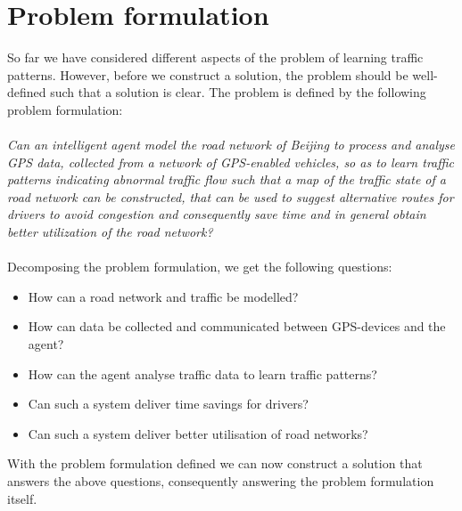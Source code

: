 \section{Problem formulation}
So far we have considered different aspects of the problem of learning traffic patterns. However, before we construct a solution, the problem should be well-defined such that a solution is clear. The problem is defined by the following problem formulation:
\\\\
\emph{Can an intelligent agent model the road network of Beijing to process and analyse GPS data, collected from a network of GPS-enabled vehicles, so as to learn traffic patterns indicating abnormal traffic flow such that a map of the traffic state of a road network can be constructed, that can be used to suggest alternative routes for drivers to avoid congestion and consequently save time and in general obtain better utilization of the road network?}
\\\\
Decomposing the problem formulation, we get the following questions:

\begin{itemize}
\item How can a road network and traffic be modelled?
\item How can data be collected and communicated between GPS-devices and the agent?
\item How can the agent analyse traffic data to learn traffic patterns?
\item Can such a system deliver time savings for drivers?
\item Can such a system deliver better utilisation of road networks?
\end{itemize}

With the problem formulation defined we can now construct a solution that answers the above questions, consequently answering the problem formulation itself.


% 
